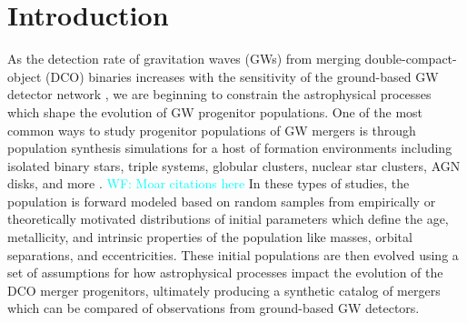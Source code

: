 \documentclass[twocolumn]{aastex631}
\newcommand{\kw}[1]{{\color{rb4}[KW: #1 ]}}
\newcommand{\wf}[1]{\textcolor{cyan}{WF: #1}}
\newcommand{\kb}[1]{\textcolor{pink}{#1}}
\begin{document}
\section{Introduction}
As the detection rate of gravitation waves (GWs) from merging
double-compact-object (DCO) binaries increases with the sensitivity of the
ground-based GW detector network
\citep{Abbott2018,LIGOScientificCollaboration2015,Buikema2020,Tse2019,Acernese2015,Acernese2019,Aso2013,Akutsu2021},
we are beginning to constrain the astrophysical processes which shape the
evolution of GW progenitor populations. One of the most common ways to study
progenitor populations of GW mergers is through population synthesis simulations
for a host of formation environments including isolated binary stars, triple
systems, globular clusters, nuclear star clusters, AGN disks, and more
\citep{Mandel2022}. \wf{Moar citations here} In these types of studies, the
population is forward modeled based on random samples from empirically or
theoretically motivated distributions of initial parameters which define the
age, metallicity, and intrinsic properties of the population like masses,
orbital separations, and eccentricities. These initial populations are then
evolved using a set of assumptions for how astrophysical processes impact the
evolution of the DCO merger progenitors, ultimately producing a synthetic
catalog of mergers which can be compared of observations from ground-based GW
detectors.



\end{document}
